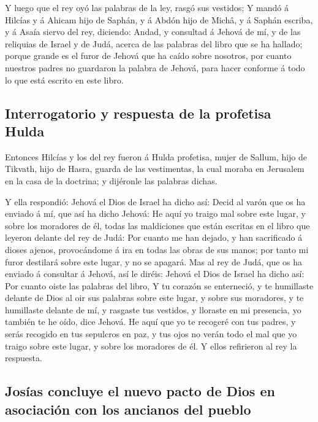  Y luego que el rey oyó las palabras de la ley, rasgó sus
vestidos;  Y mandó á Hilcías y á Ahicam hijo de Saphán, y
á Abdón hijo de Michâ, y á Saphán escriba, y á Asaía siervo del rey,
diciendo:  Andad, y consultad á Jehová de mí, y de las
reliquias de Israel y de Judá, acerca de las palabras del libro que se
ha hallado; porque grande es el furor de Jehová que ha caído sobre
nosotros, por cuanto nuestros padres no guardaron la palabra de Jehová,
para hacer conforme á todo lo que está escrito en este libro.

\hypertarget{interrogatorio-y-respuesta-de-la-profetisa-hulda}{%
\subsection{Interrogatorio y respuesta de la profetisa
Hulda}\label{interrogatorio-y-respuesta-de-la-profetisa-hulda}}

 Entonces Hilcías y los del rey fueron á Hulda profetisa,
mujer de Sallum, hijo de Tikvath, hijo de Hasra, guarda de las
vestimentas, la cual moraba en Jerusalem en la casa de la doctrina; y
dijéronle las palabras dichas.

 Y ella respondió: Jehová el Dios de Israel ha dicho así:
Decid al varón que os ha enviado á mí, que así ha dicho Jehová:
 He aquí yo traigo mal sobre este lugar, y sobre los
moradores de él, todas las maldiciones que están escritas en el libro
que leyeron delante del rey de Judá:  Por cuanto me han
dejado, y han sacrificado á dioses ajenos, provocándome á ira en todas
las obras de sus manos; por tanto mi furor destilará sobre este lugar, y
no se apagará.  Mas al rey de Judá, que os ha enviado á
consultar á Jehová, así le diréis: Jehová el Dios de Israel ha dicho
así: Por cuanto oiste las palabras del libro,  Y tu
corazón se enterneció, y te humillaste delante de Dios al oir sus
palabras sobre este lugar, y sobre sus moradores, y te humillaste
delante de mí, y rasgaste tus vestidos, y lloraste en mi presencia, yo
también te he oído, dice Jehová.  He aquí que yo te
recogeré con tus padres, y serás recogido en tus sepulcros en paz, y tus
ojos no verán todo el mal que yo traigo sobre este lugar, y sobre los
moradores de él. Y ellos refirieron al rey la respuesta.

\hypertarget{josuxedas-concluye-el-nuevo-pacto-de-dios-en-asociaciuxf3n-con-los-ancianos-del-pueblo}{%
\subsection{Josías concluye el nuevo pacto de Dios en asociación con los
ancianos del
pueblo}\label{josuxedas-concluye-el-nuevo-pacto-de-dios-en-asociaciuxf3n-con-los-ancianos-del-pueblo}}

